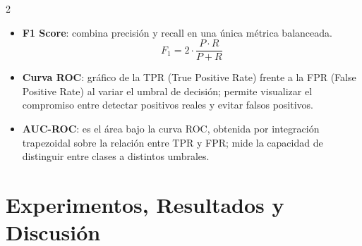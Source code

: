 \documentclass[11pt]{article}
\begin{document}
\begin{multicols}{2}
\begin{itemize}
    \item \textbf{F1 Score}: combina precisión y recall en una única métrica balanceada.
    \vspace{-0.5em}
    \begin{equation}
        \textstyle F_1 = 2 \cdot \frac{P \cdot R}{P + R} \label{eq: F-score}
    \end{equation}
    
    \item \textbf{Curva ROC}: gráfico de la TPR (True Positive Rate) frente a la FPR (False Positive Rate) al variar el umbral de decisión; permite visualizar el compromiso entre detectar positivos reales y evitar falsos positivos.
    \label{met: ROC}
    
    \item \textbf{AUC-ROC}: es el área bajo la curva ROC, obtenida por integración trapezoidal sobre la relación entre TPR y FPR; mide la capacidad de distinguir entre clases a distintos umbrales. 
    
\end{itemize}

\vspace{-0.5em}

\end{multicols}


\vspace{1em}
\section{Experimentos, Resultados y Discusión}
\end{document}
